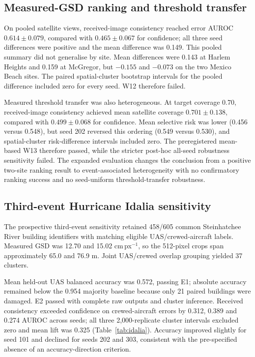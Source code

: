 \subsection{Measured-GSD ranking and threshold transfer}

On pooled satellite views, received-image consistency reached error AUROC
\(0.614\pm0.079\), compared with \(0.465\pm0.067\) for confidence; all three
seed differences were positive and the mean difference was 0.149. This pooled
summary did not generalise by site. Mean differences were 0.143 at Harlem
Heights and 0.159 at McGregor, but \(-0.155\) and \(-0.073\) on the two
Mexico Beach sites. The paired spatial-cluster bootstrap intervals for the
pooled difference included zero for every seed. W12 therefore failed.

Measured threshold transfer was also heterogeneous. At target coverage 0.70,
received-image consistency achieved mean satellite coverage
\(0.701\pm0.138\), compared with \(0.499\pm0.068\) for confidence. Mean
selective risk was lower (0.456 versus 0.548), but seed 202 reversed this
ordering (0.549 versus 0.530), and spatial-cluster risk-difference intervals
included zero. The preregistered mean-based W13 therefore passed, while the
stricter post-hoc all-seed robustness sensitivity failed. The expanded
evaluation changes the conclusion from a positive two-site ranking result to
event-associated heterogeneity with no confirmatory ranking success and no
seed-uniform threshold-transfer robustness.

\subsection{Third-event Hurricane Idalia sensitivity}

The prospective third-event sensitivity retained 458/605 common Steinhatchee
River building identifiers with matching eligible UAS/crewed-aircraft labels.
Measured GSD was 12.70 and 15.02 cm\,px\(^{-1}\), so the 512-pixel crops span
approximately 65.0 and 76.9 m. Joint UAS/crewed overlap grouping yielded 37
clusters.

Mean held-out UAS balanced accuracy was 0.572, passing E1; absolute accuracy
remained below the 0.954 majority baseline because only 21 paired buildings
were damaged. E2 passed with complete raw outputs and cluster inference.
Received consistency exceeded confidence on crewed-aircraft errors by 0.312,
0.389 and 0.274 AUROC across seeds; all three 2,000-replicate cluster intervals
excluded zero and mean lift was 0.325 (Table~\ref{tab:idalia}). Accuracy
improved slightly for seed 101 and declined for seeds 202 and 303, consistent
with the pre-specified absence of an accuracy-direction criterion.


